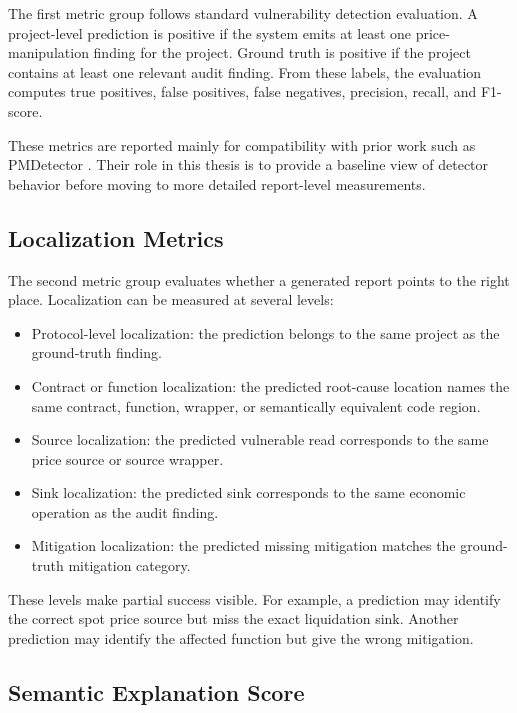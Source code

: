 The first metric group follows standard vulnerability detection evaluation. A
project-level prediction is positive if the system emits at least one
price-manipulation finding for the project. Ground truth is positive if the
project contains at least one relevant audit finding. From these labels, the
evaluation computes true positives, false positives, false negatives,
precision, recall, and F1-score.

These metrics are reported mainly for compatibility with prior work such as
PMDetector \citep{pmdetector}. Their role in this thesis is to provide a
baseline view of detector behavior before moving to more detailed report-level
measurements.

\subsection{Localization Metrics}

The second metric group evaluates whether a generated report points to the
right place. Localization can be measured at several levels:

\begin{itemize}
  \item Protocol-level localization: the prediction belongs to the same
        project as the ground-truth finding.
  \item Contract or function localization: the predicted root-cause location
        names the same contract, function, wrapper, or semantically equivalent
        code region.
  \item Source localization: the predicted vulnerable read corresponds to the
        same price source or source wrapper.
  \item Sink localization: the predicted sink corresponds to the same economic
        operation as the audit finding.
  \item Mitigation localization: the predicted missing mitigation matches the
        ground-truth mitigation category.
\end{itemize}

These levels make partial success visible. For example, a prediction may
identify the correct spot price source but miss the exact liquidation sink.
Another prediction may identify the affected function but give the wrong
mitigation.

\subsection{Semantic Explanation Score}

